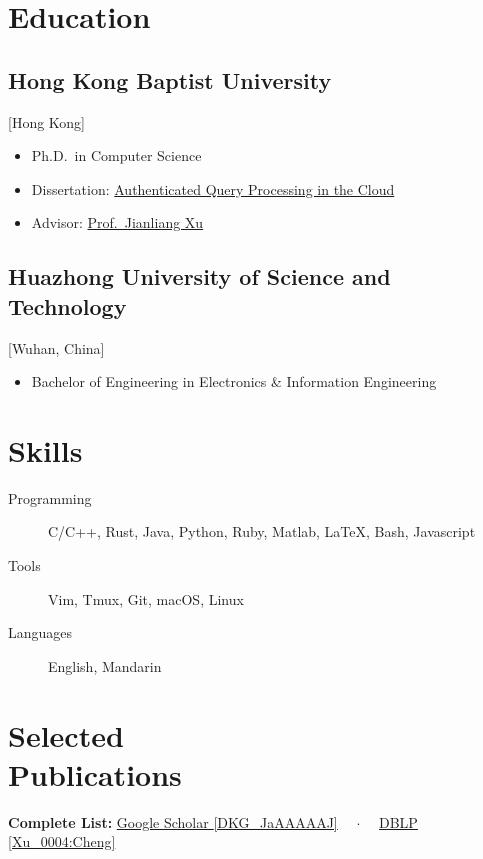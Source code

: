 \documentclass{mycv}
\begin{document}
\section{Education}

\subsection{Hong Kong Baptist University}[Hong Kong]
\vspace{-\parskip}%
\begin{itemize}[label={}]
  \item Ph.D.\ in Computer Science 
  \item Dissertation: \href{https://repository.hkbu.edu.hk/etd_oa/620}{Authenticated Query Processing in the Cloud}
  \item Advisor: \href{https://www.comp.hkbu.edu.hk/~xujl}{Prof.~Jianliang Xu}
\end{itemize}

\subsection{Huazhong University of Science and Technology}[Wuhan, China]
\vspace{-\parskip}%
\begin{itemize}[label={}]
  \item Bachelor of Engineering in Electronics \& Information Engineering 
\end{itemize}

\section{Skills}

\begin{description}
  \item[Programming] C/C++, Rust, Java, Python, Ruby, Matlab, \LaTeX, Bash, Javascript
  \item[Tools] Vim, Tmux, Git, macOS, Linux
  \item[Languages] English, Mandarin
\end{description}

\section{Selected \\ Publications}%

\textbf{Complete List:}
\href{https://scholar.google.com/citations?user=DKG_JaAAAAAJ}{Google Scholar \textsf{\footnotesize [DKG\_JaAAAAAJ]}}%
{~~$\cdot$~~}%
\href{https://dblp.org/pers/hd/x/Xu_0004:Cheng}{DBLP \textsf{\footnotesize [Xu\_0004:Cheng]}}%
\end{document}
